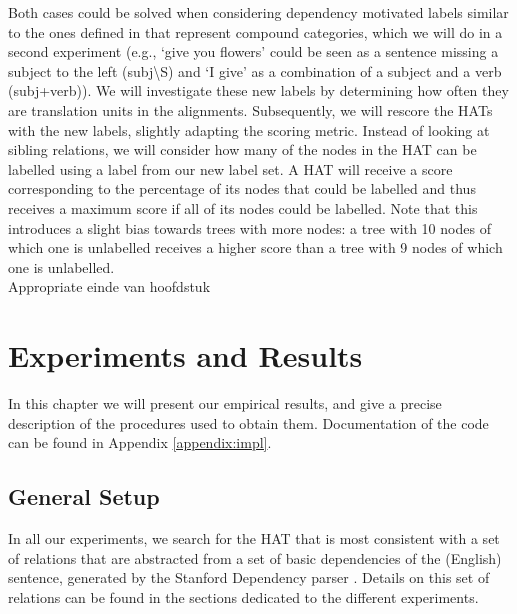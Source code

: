 \documentclass[a4paper, 11pt]{report}
\theoremstyle{definition}
\theoremstyle{plain}
\begin{document}
Both cases could be solved when considering dependency motivated labels similar to the ones defined in \cite{zollmann2006syntax} that represent compound categories, which we will do in a second experiment (e.g., `give you flowers' could be seen as a sentence missing a subject to the left (subj\textbackslash S) and `I give' as a combination of a subject and a verb (subj+verb)). We will investigate these new labels by determining how often they are translation units in the alignments. Subsequently, we will rescore the HATs with the new labels, slightly adapting the scoring metric. Instead of looking at sibling relations, we will consider how many of the nodes in the HAT can be labelled using a label from our new label set. A HAT will receive a score corresponding to the percentage of its nodes that could be labelled and thus receives a maximum score if all of its nodes could be labelled. Note that this introduces a slight bias towards trees with more nodes: a tree with 10 nodes of which one is unlabelled receives a higher score than a tree with 9 nodes of which one is unlabelled.\\
Appropriate einde van hoofdstuk%




%
%


\chapter{Experiments and Results}

In this chapter we will present our empirical results, and give a precise description of the procedures used to obtain them. Documentation of the code can be found in Appendix \ref{appendix:impl}.\\

\section{General Setup}



In all our experiments, we search for the HAT that is most consistent with a set of relations that are abstracted from a set of basic dependencies of the (English) sentence, generated by the Stanford Dependency parser \cite{de2006generating}. Details on this set of relations can be found in the sections dedicated to the different experiments.\\
\end{document}

